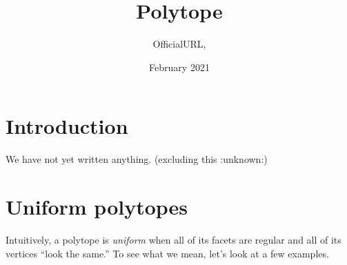 \documentclass{article}
\title{Polytope}
\author{OfficialURL, }
\date{February 2021}
\begin{document}
\maketitle

\section{Introduction}
We have not yet written anything. (excluding this :unknown:)

\section{Uniform polytopes}
Intuitively, a polytope is \textit{uniform} when all of its facets are regular and all of its vertices ``look the same.'' To see what we mean, let's look at a few examples.
\end{document}
